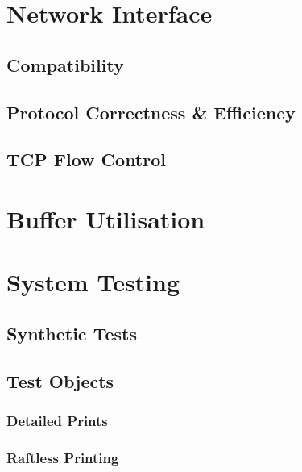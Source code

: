 	\section{Network Interface}
		
		\subsection{Compatibility}
		
		\subsection{Protocol Correctness \& Efficiency}
			
			\label{sec:udpPerformance}
		
		\subsection{TCP Flow Control}
			
			\label{sec:tcpProblem}
	
	\section{Buffer Utilisation}
	
	\section{System Testing}
		
		\subsection{Synthetic Tests}
		
		\subsection{Test Objects}
			
			\subsubsection{Detailed Prints}
			
			\subsubsection{Raftless Printing}
